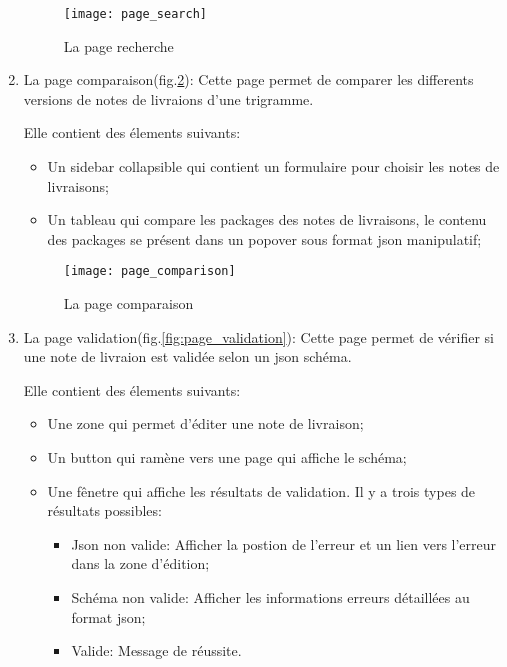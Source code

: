 \begin{enumerate}
       \begin{figure}[ht]
        \centering
        \texttt{[image: page\_search]}
        \caption{La page recherche}
        \label{fig:page_search}
       \end{figure}

 \item La page comparaison(fig.\ref{fig:page_comparaison}):
       Cette page permet de comparer les differents versions de notes de livraions d'une trigramme.

       Elle contient des élements suivants:
       \begin{itemize}
        \item Un sidebar collapsible qui contient un formulaire pour choisir les notes de livraisons;
        \item Un tableau qui compare les packages des notes de livraisons, le contenu des packages se présent dans un popover sous format json manipulatif;
       \end{itemize}

       \begin{figure}[ht]
        \centering
        \texttt{[image: page\_comparison]}
        \caption{La page comparaison}
        \label{fig:page_comparaison}
       \end{figure}

       \clearpage

 \item La page validation(fig.\ref{fig:page_validation}):
       Cette page permet de vérifier si une note de livraion est validée selon un json schéma.

       Elle contient des élements suivants:
       \begin{itemize}
        \item Une zone qui permet d'éditer une note de livraison;
        \item Un button qui ramène vers une page qui affiche le schéma;
        \item Une fênetre qui affiche les résultats de validation. Il y a trois types de résultats possibles:
              \begin{itemize}
               \item Json non valide: Afficher la postion de l'erreur et un lien vers l'erreur dans la zone d'édition;
               \item Schéma non valide: Afficher les informations erreurs détaillées au format json;
               \item Valide: Message de réussite.
              \end{itemize}
       \end{itemize}


\end{enumerate}
